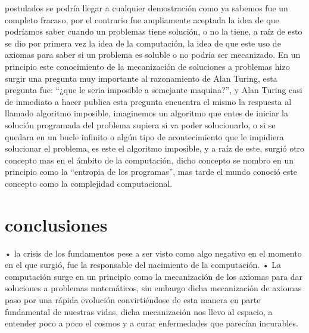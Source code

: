 \documentclass{article}
\begin{document}
postulados se podría llegar a cualquier demostración como ya sabemos fue un completo fracaso, por el contrario fue ampliamente aceptada la idea de que podríamos saber cuando un problemas tiene solución, o no la tiene, a raíz de esto se dio por primera vez la idea de la computación, la idea de que este uso de axiomas para saber si un problema es soluble o no podría ser mecanizado.
En un principio este conocimiento de la mecanización de soluciones a problemas hizo surgir una pregunta muy importante al razonamiento de Alan Turing, esta pregunta fue: “¿que le seria imposible a semejante maquina?”, y Alan Turing casi de inmediato a hacer publica esta pregunta encuentra el mismo la respuesta al llamado algoritmo imposible, imaginemos un algoritmo que entes de iniciar la solución programada del problema supiera si va poder solucionarlo, o si se quedara en un bucle infinito o algún tipo de acontecimiento que le impidiera solucionar el problema, es este el algoritmo imposible, y a raíz de este, surgió otro concepto mas en el ámbito de la computación, dicho concepto se nombro en un principio como la “entropia de los programas”, mas tarde el mundo conoció este concepto como la complejidad computacional. 

\section{conclusiones}
• la crisis de los fundamentos pese a ser visto como algo negativo en el momento en el que surgió, fue la responsable del nacimiento de la computación.
•  La computación surge en un principio como la mecanización de los axiomas para dar soluciones a problemas matemáticos, sin embargo dicha mecanización de axiomas paso por una rápida evolución convirtiéndose de esta manera en parte fundamental de nuestras vidas, dicha mecanización nos llevo al espacio, a entender poco a poco el cosmos y a curar enfermedades que parecían incurables. \cite{NormaIPC} \cite{NormaIPA} \cite{NormaIPR}



\end{document}
